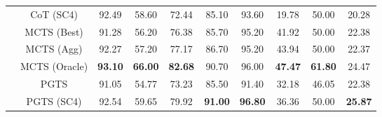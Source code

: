 \begin{table*}[]
\begin{tabular}{c|c|ccc|c|cc|cc}
         & CoT (SC4) & 92.49 & 58.60 & 72.44 & 85.10 & 93.60 & 19.78 & 50.00 & 20.28\\
    \cmidrule(lr){2-10}
         & MCTS (Best) & 91.28 & 56.20 & 76.38 & 85.70 & 95.20 & 41.92 & 50.00 & 22.38\\
         & MCTS (Agg) & 92.27 & 57.20 & 77.17 & 86.70 & 95.20 & 43.94 & 50.00 & 22.37\\
         & MCTS (Oracle) & \textbf{93.10} & \textbf{66.00} & \textbf{82.68} & 90.70 & 96.00 & \textbf{47.47} & \textbf{61.80} & 24.47\\
    \cmidrule(lr){2-10}
         & PGTS & 91.05 & 54.77 & 73.23 & 85.50 & 91.40 & 32.18 & 46.05 & 22.38\\
         & PGTS (SC4) & 92.54 & 59.65 & 79.92 & \textbf{91.00} & \textbf{96.80} & 36.36 & 50.00 & \textbf{25.87}\\
    \bottomrule
    \end{tabular}
    \vspace{-6pt}
\end{table*}